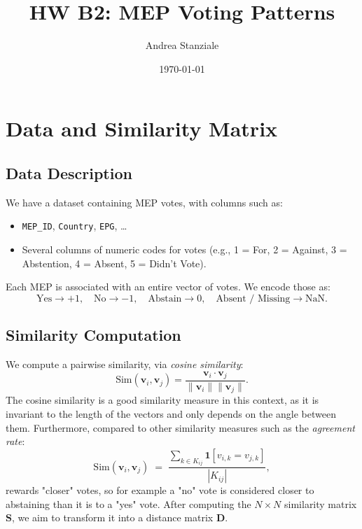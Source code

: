 \documentclass{article}
\title{HW B2: MEP Voting Patterns}
\author{Andrea Stanziale}
\date{\today}
\begin{document}
\maketitle

\section{Data and Similarity Matrix}

\subsection{Data Description}

We have a dataset containing MEP votes, with columns such as:
\begin{itemize}
    \item \texttt{MEP\_ID}, \texttt{Country}, \texttt{EPG}, \ldots
    \item Several columns of numeric codes for votes (e.g., 1 = For, 2 = Against, 3 = Abstention, 4 = Absent, 5 = Didn't Vote).
\end{itemize}

Each MEP is associated with an entire vector of votes. We encode those as:
\[
    \text{Yes} \to +1,\quad 
    \text{No} \to -1,\quad
    \text{Abstain} \to 0,\quad
    \text{Absent / Missing} \to \text{NaN}.
\]

\subsection{Similarity Computation}

We compute a pairwise similarity, via \emph{cosine similarity}:
\[
    \text{Sim}(\mathbf{v}_i, \mathbf{v}_j)
    = \frac{\mathbf{v}_i \cdot \mathbf{v}_j}{\|\mathbf{v}_i\|\|\mathbf{v}_j\|}.
\]
The cosine similarity is a good similarity measure in this context, as it is invariant to the length of the vectors and only depends on the angle between them.
Furthermore, compared to other similarity measures such as the \emph{agreement rate}:
\[
    \text{Sim}(\mathbf{v}_i, \mathbf{v}_j) 
    \;=\; \frac{\sum_{k \in K_{ij}} \mathbf{1}[v_{i,k} = v_{j,k}]}{|K_{ij}|},
\]
rewards "closer" votes, so for example a "no" vote is considered closer to abstaining than it is to a "yes" vote.
After computing the \(N\times N\) similarity matrix \(\mathbf{S}\), we aim to transform it into a distance matrix \(\mathbf{D}\).

\end{document}
